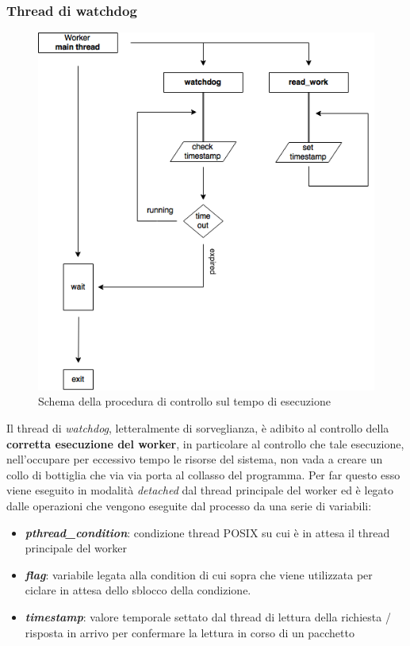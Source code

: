 \documentclass[italian]{tktltiki2}
\begin{document}
\subsubsection{Thread di watchdog}
\label{sec:watchdog}
\begin{figure}[h]
\centering
\includegraphics[width=\textwidth]{images/watchdog}
\caption{Schema della procedura di controllo sul tempo di esecuzione \label{fig: watchdog}}
\end{figure}
Il thread di \emph{watchdog}, letteralmente di sorveglianza, è adibito al controllo della \textbf{corretta esecuzione del worker}, in particolare al controllo che tale esecuzione, nell'occupare per eccessivo tempo le risorse del sistema, non vada a creare un collo di bottiglia che via via porta al collasso del programma. Per far questo esso viene eseguito in modalità \emph{detached} dal thread principale del worker ed è legato dalle operazioni che vengono eseguite dal processo da una serie di variabili: 
\begin{itemize}
	\item \textbf{\emph{pthread\_condition}}: condizione thread POSIX su cui è in attesa il thread principale del worker
	\item \textbf{\emph{flag}}: variabile legata alla condition di cui sopra che viene utilizzata per ciclare in attesa dello sblocco della condizione.
	\item \textbf{\emph{timestamp}}: valore temporale settato dal thread di lettura della richiesta / risposta in arrivo per confermare la lettura in corso di un pacchetto
\end{itemize}
\end{document}
